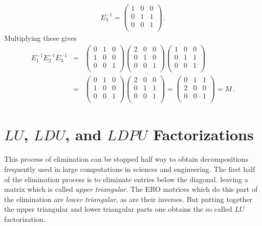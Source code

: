 \begin{example}
\begin{eqnarray*}
E_3^{-1}
= \left(\begin{array}{ccc}
1  &0 &0\\
0  &1 & 1\\ 
0  &0 &1\\
\end{array}  \right) \,.
\end{eqnarray*}
Multiplying these gives 
\begin{eqnarray*}
E_1^{-1}E_2^{-1}E_3^{-1}
&=& 
\left(\begin{array}{ccc}
0  &1 &0\\
1  &0 &0\\ 
0  &0 &1\\
\end{array}  \right)
 \left(\begin{array}{ccc}
2  &0 &0\\
0  &1 &0\\ 
0  &0 &1\\
\end{array}  \right) 
\left(\begin{array}{ccc}
1  &0 &0\\
0  &1 & 1\\ 
0  &0 &1\\
\end{array}  \right) 
\\ %
&=&
\left(\begin{array}{ccc}
0  &1 &0\\
1  &0 &0\\ 
0  &0 &1\\
\end{array}  \right)
 \left(\begin{array}{ccc}
2  &0 &0\\
0  &1 &1\\ 
0  &0 &1\\
\end{array}  \right) 
= %
\left(\begin{array}{ccc}
 0 &1 &1\\
2  &0 &0\\ 
0  &0 &1\\
\end{array}  \right)  = M \, .
\end{eqnarray*}
\end{example}

\section{$LU$, $LDU$, and $LDPU$ Factorizations}
This process of elimination can be stopped half way to obtain decompositions frequently used in large computations in sciences and engineering. 
The first half of the elimination process is to eliminate entries below the diagonal. 
leaving a matrix which is called {\it upper triangular}. The ERO matrices which do this part of the elimination are {\it lower triangular}, as are their inverses. But putting together the upper triangular and lower triangular parts one obtains the so called $LU$ factorization.

